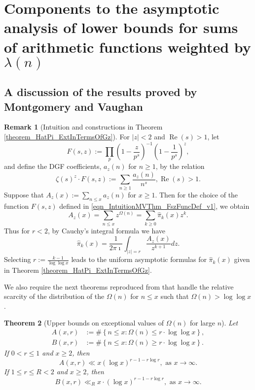\documentclass[11pt,reqno,a4letter]{article}
\numberwithin{figure}{section}
\numberwithin{table}{section}
\theoremstyle{plain}
\newtheorem{theorem}{Theorem}
\numberwithin{theorem}{section}
\theoremstyle{definition}
\newtheorem{remark}[theorem]{Remark}
\renewcommand{\Re}{\operatorname{Re}}
\begin{document}
\newpage 
\section{Components to the asymptotic analysis of lower bounds for 
         sums of arithmetic functions weighted by $\lambda(n)$} 
\label{Section_MVCh7_GzBounds} 

\subsection{A discussion of the results proved by Montgomery and Vaughan} 
\label{subSection_MVPrereqResultStmts} 

\begin{remark}[Intuition and constructions in Theorem \ref{theorem_HatPi_ExtInTermsOfGz}] 
\label{remark_intuitionConstrIn_theorem_HatPi_ExtInTermsOfGz} 
For $|z| < 2$ and $\Re(s) > 1$, let 
\begin{equation} 
\label{eqn_IntuitionMVThm_FszFuncDef_v1} 
F(s, z) := \prod_{p} \left(1 - \frac{z}{p^s}\right)^{-1} \left(1 - \frac{1}{p^s}\right)^{z}, 
\end{equation} 
and define the DGF coefficients, $a_z(n)$ for $n \geq 1$, by the relation 
\[
\zeta(s)^{z} \cdot F(s, z) := \sum_{n \geq 1} \frac{a_z(n)}{n^s}, \Re(s) > 1. 
\]
Suppose that $A_z(x) := \sum_{n \leq x} a_z(n)$ for $x \geq 1$. Then for the choice of the 
function $F(s, z)$ defined in \eqref{eqn_IntuitionMVThm_FszFuncDef_v1}, we obtain 
\[
A_z(x) = \sum_{n \leq x} z^{\Omega(n)} = \sum_{k \geq 0} \widehat{\pi}_k(x) z^k. 
\]
Thus for $r < 2$, by Cauchy's integral formula we have 
\[
\widehat{\pi}_k(x) = \frac{1}{2\pi\imath} \int_{|z|=r} \frac{A_z(x)}{z^{k+1}} dz. 
\]
Selecting $r := \frac{k-1}{\log\log x}$ leads to the uniform asymptotic formulas for 
$\widehat{\pi}_k(x)$ given in 
Theorem \ref{theorem_HatPi_ExtInTermsOfGz}. 
\end{remark} 

We also require the next theorems reproduced from \cite[\S 7.4]{MV} that handle the relative 
scarcity of the distribution of the $\Omega(n)$ for $n \leq x$ such that 
$\Omega(n) > \log\log x$. 

\begin{theorem}[Upper bounds on exceptional values of $\Omega(n)$ for large $n$] 
\label{theorem_MV_Thm7.20-init_stmt} 
Let 
\begin{align*} 
A(x, r) & := \#\left\{n \leq x: \Omega(n) \leq r \cdot \log\log x\right\}, \\ 
B(x, r) & := \#\left\{n \leq x: \Omega(n) \geq r \cdot \log\log x\right\}. 
\end{align*} 
If $0 < r \leq 1$ and $x \geq 2$, then 
\[
A(x, r) \ll x (\log x)^{r-1 - r\log r}, \text{ \ as\ } x \rightarrow \infty. 
\]
If $1 \leq r \leq R < 2$ and $x \geq 2$, then 
\[
B(x, r) \ll_R x \cdot (\log x)^{r-1-r \log r}, \text{ \ as\ } x \rightarrow \infty. 
\]
\end{theorem} 
\end{document}
